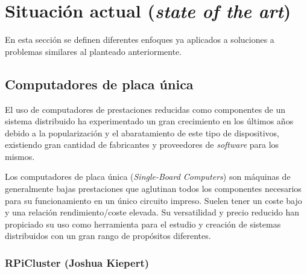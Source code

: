 \section{Situación actual (\textit{state of the art})}
\label{stateoftheart}
En esta sección se definen diferentes enfoques ya aplicados a soluciones a problemas similares al planteado anteriormente.

\subsection{Computadores de placa única}

El uso de computadores de prestaciones reducidas como componentes de un sistema distribuido ha experimentado un gran crecimiento en los últimos años debido a la popularización y el abaratamiento de este tipo de dispositivos, existiendo gran cantidad de fabricantes y proveedores de \textit{software} para los mismos.

Los computadores de placa única (\textit{Single-Board Computers}) son máquinas de generalmente bajas prestaciones que aglutinan todos los componentes necesarios para su funcionamiento en un único circuito impreso. Suelen tener un coste bajo y una relación rendimiento/coste elevada. Su versatilidad y precio reducido han propiciado su uso como herramienta para el estudio y creación de sistemas distribuidos con un gran rango de propósitos diferentes.

\subsubsection{RPiCluster (Joshua Kiepert)}

